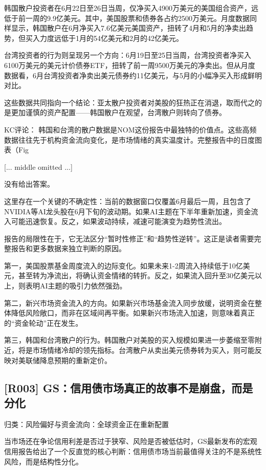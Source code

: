 \documentclass[11pt]{ctexart}
\begin{document}
韩国散户投资者在6月22日至26日当周，仅净买入4900万美元的美国组合资产，远低于前一周的9.9亿美元。其中，美国股票和债券各占约2500万美元。月度数据同样显示，韩国散户在6月净买入7.6亿美元美国资产，扭转了4月和5月的净卖出趋势，但买入力度远低于1月的54亿美元和2月的42亿美元。

台湾投资者的行为则呈现另一个方向：6月19日至25日当周，台湾投资者净买入6100万美元的美元计价债券ETF，扭转了前一周9500万美元的净卖出。但从月度数据看，6月台湾投资者净卖出美元债券约11亿美元，与5月的小幅净买入形成鲜明对比。

这些数据共同指向一个结论：亚太散户投资者对美股的狂热正在消退，取而代之的是更加谨慎的资产配置——韩国散户在观望，台湾散户则转向了债券。

KC评论： 韩国和台湾的散户数据是NOM这份报告中最独特的价值点。这些高频数据往往先于机构资金流向变化，是市场情绪的真实温度计。完整报告中的日度图表（Fig

[... middle omitted ...]

没有给出答案。

这里存在一个关键的不确定性：当前的数据窗口仅覆盖6月最后一周，且包含了NVIDIA等AI龙头股在6月下旬的波动期。如果AI主题在下半年重新加速，资金流入可能迅速恢复。反之，如果波动持续，减速可能演变为趋势性流出。

报告的局限性在于，它无法区分“暂时性修正”和“趋势性逆转”。这正是读者需要完整报告和更多数据来独立判断的原因。

第一，美国股票基金周度流入的边际变化。如果未来1-2周流入持续低于10亿美元，甚至转为净流出，将确认资金情绪的转折。反之，如果流入回升至30亿美元以上，则表明AI主题的吸引力依然强劲。

第二，新兴市场资金流入的方向。如果新兴市场基金流入同步放缓，说明资金在整体降低风险敞口，而非在区域间再平衡。如果新兴市场流入加速，则意味着真正的“资金轮动”正在发生。

第三，韩国和台湾散户的行为。韩国散户对美股的买入规模如果进一步萎缩至零附近，将是市场情绪冷却的领先指标。台湾散户从卖出美元债券转为买入，则可能反映对美联储降息预期的重新定价。

\subsection{[R003] GS：信用债市场真正的故事不是崩盘，而是分化}
{\small\color{refgray}归类：风险偏好与资金流向：全球资金正在重新配置}

当市场还在争论信用利差是否过于狭窄、风险是否被低估时，GS最新发布的宏观信用报告给出了一个反直觉的核心判断：信用债市场当前最值得关注的不是系统性风险，而是结构性分化。
\end{document}
